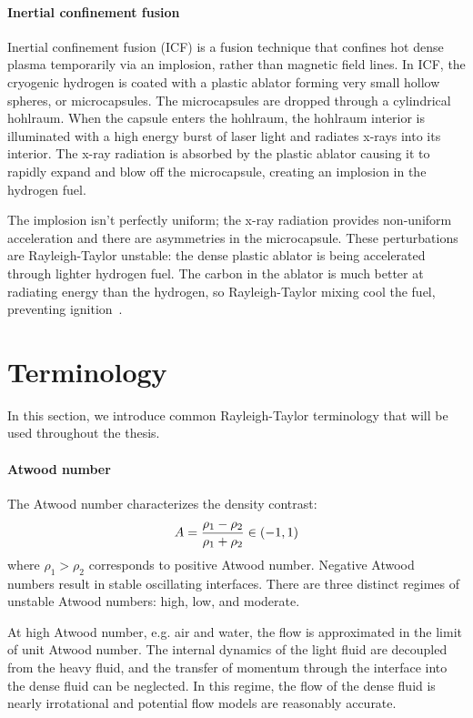 \paragraph{Inertial confinement fusion}
Inertial confinement fusion (ICF) is a fusion technique that confines hot dense plasma temporarily via an implosion, rather than magnetic field lines.
In ICF, the cryogenic hydrogen is coated with a plastic ablator forming very small hollow spheres, or microcapsules.
The microcapsules are dropped through a cylindrical hohlraum.
When the capsule enters the hohlraum, the hohlraum interior is illuminated with a high energy burst of laser light and radiates x-rays into its interior.
The x-ray radiation is absorbed by the plastic ablator causing it to rapidly expand and blow off the microcapsule, creating an implosion in the hydrogen fuel.

The implosion isn't perfectly uniform; the x-ray radiation provides non-uniform acceleration and there are asymmetries in the microcapsule.
These perturbations are Rayleigh-Taylor unstable: the dense plastic ablator is being accelerated through lighter hydrogen fuel.
The carbon in the ablator is much better at radiating energy than the hydrogen, so Rayleigh-Taylor mixing cool the fuel, preventing ignition~\cite{goncharov2012panel}.

\section{Terminology}

In this section, we introduce common Rayleigh-Taylor terminology that will be used throughout the thesis.

\paragraph{Atwood number}
The Atwood number characterizes the density contrast:
\begin{equation} \elabel{atwood}
A = \frac{\rho_1 - \rho_2}{\rho_1 + \rho_2} \in (-1,1)
\end{equation}
where $\rho_1 > \rho_2$ corresponds to positive Atwood number.
Negative Atwood numbers result in stable oscillating interfaces.
There are three distinct regimes of unstable Atwood numbers: high, low, and moderate.

At high Atwood number, e.g. air and water, the flow is approximated in the limit of unit Atwood number.
The internal dynamics of the light fluid are decoupled from the heavy fluid, and the transfer of momentum through the interface into the dense fluid can be neglected.
In this regime, the flow of the dense fluid is nearly irrotational and potential flow models are reasonably accurate.

